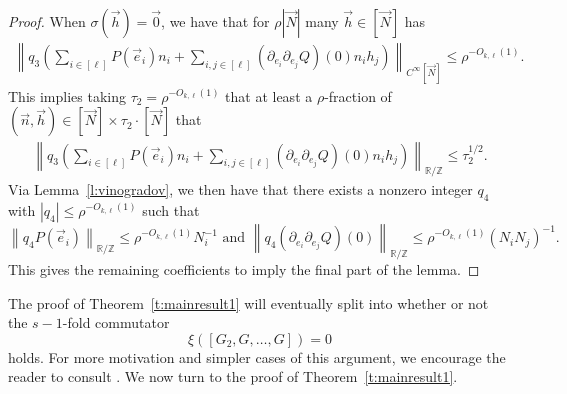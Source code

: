 \documentclass[11pt, a4paper]{amsart}
\theoremstyle{plain}
\theoremstyle{plain}
\theoremstyle{definition}
\theoremstyle{remark}
\numberwithin{equation}{section}
\numberwithin{lemma}{section}
\numberwithin{proposition}{section}
\numberwithin{corollary}{section}
\numberwithin{definition}{section}
\numberwithin{claim}{section}
\begin{document}
\begin{proof}
When $\sigma(\vec{h}) = \vec{0}$, we have that for $\rho |\vec{N}|$ many $\vec{h} \in [\vec{N}]$ has
\begin{align*}
\left\|q_3\left(\sum_{i\in [\ell]}P(\vec{e}_i) n_i+ \sum_{i, j \in [\ell]}(\partial_{e_i}\partial_{e_j}Q)(0) n_ih_j\right)\right\|_{C^\infty[\vec{N}]} \le \rho^{-O_{k,\ell}(1)}.
\end{align*}
This implies taking $\tau_2 = \rho^{-O_{k,\ell}(1)}$ that at least a $\rho$-fraction of $(\vec{n},\vec{h})\in [\vec{N}]\times \tau_2\cdot [\vec{N}]$ that 
\begin{align*}
\left\|q_3\left(\sum_{i\in [\ell]}P(\vec{e}_i) n_i+ \sum_{i, j \in [\ell]} (\partial_{e_i}\partial_{e_j}Q)(0) n_ih_j\right)\right\|_{\mathbb{R}/\mathbb{Z}} \le\tau_2^{1/2}.
\end{align*}
Via Lemma~\ref{l:vinogradov}, we then have that there exists a nonzero integer $q_4$ with $|q_4|\le \rho^{-O_{k,\ell}(1)}$ such that 
\[\left\|q_4P(\vec{e}_i)\right\|_{\mathbb{R}/\mathbb{Z}}\le \rho^{-O_{k,\ell}(1)}N_i^{-1}\text{ and } \left\|q_4(\partial_{e_i}\partial_{e_j}Q)(0)  \right\|_{\mathbb{R}/\mathbb{Z}}\le \rho^{-O_{k,\ell}(1)}(N_iN_j)^{-1}.\]
This gives the remaining coefficients to imply the final part of the lemma.    
\end{proof}

The proof of Theorem~\ref{t:mainresult1} will eventually split into whether or not the $s - 1$-fold commutator
$$\xi([G_2, G, \dots, G]) = 0$$
holds. For more motivation and simpler cases of this argument, we encourage the reader to consult \cite{LenNew}. We now turn to the proof of Theorem~\ref{t:mainresult1}.
\end{document}

